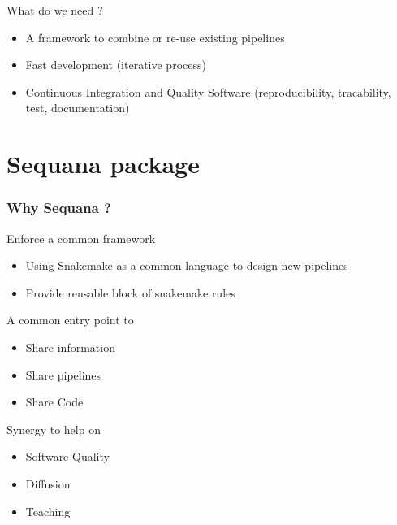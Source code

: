 \documentclass{beamer}
\begin{document}
\begin{frame}
    \begin{block}{What do we need ?}
    \begin{itemize}
     \item A framework to combine or re-use existing pipelines
     \item Fast development (iterative process)
     \item Continuous Integration and Quality Software (reproducibility, tracability, test, documentation)
    \end{itemize}
    \end{block}


 
\end{frame}
\section{Sequana package}


\begin{frame}
    \frametitle{Why Sequana ?}
    
    \begin{block}{Enforce a common framework}
    \begin{itemize}
        \item Using Snakemake as a common language to design new pipelines
        \item Provide reusable block of snakemake rules
    \end{itemize} 
     \end{block}

    \begin{block}{A common entry point to }
    \begin{itemize}
        \item Share information
        \item Share pipelines
        \item Share Code
    \end{itemize} 
    \end{block}

    \begin{block}{Synergy to help on }
    \begin{itemize}
        \item Software Quality
        \item Diffusion
        \item Teaching
    \end{itemize} 
    \end{block}
    
\end{frame}
\end{document}
